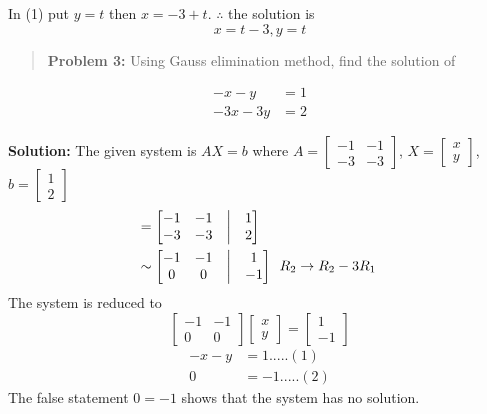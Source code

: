 \documentclass[
  letterpaper,
  DIV=11,
  numbers=noendperiod]{scrreprt}
\begin{document}
In (1) put \(y=t\) then \(x=-3+t\). \(\therefore\) the solution is
\[x=t-3,y=t\]

\begin{quote}
\textbf{Problem 3:} Using Gauss elimination method, find the solution of
\end{quote}

\begin{align*}
-x-y &=1\\
-3x-3y &=2
\end{align*}

\textbf{Solution:} The given system is \(AX=b\) where
\(A=\begin{bmatrix}
    -1 &-1\\
    -3 &-3
\end{bmatrix}\), \(X=\begin{bmatrix}
    x\\
    y
\end{bmatrix}\), \(b=\begin{bmatrix}
    1\\
    2
\end{bmatrix}\) \begin{align*}
    [A|b]&=\begin{bmatrix}
        -1 &-1 &\bigm| &1\\
        -3 &-3 &\bigm| &2
    \end{bmatrix}\\
    &\sim \begin{bmatrix}
        -1 &-1 &\bigm| &1\\
        0 &0 &\bigm| &-1
    \end{bmatrix}\begin{array}{c}
        R_2\rightarrow R_2-3R_1
    \end{array}
\end{align*} The system is reduced to \[\begin{bmatrix}
    -1 &-1\\
    0 &0
\end{bmatrix}\begin{bmatrix}
    x\\
    y
\end{bmatrix}=\begin{bmatrix}
    1\\
    -1
\end{bmatrix}\] \begin{align*}
    -x-y &=1.....(1)\\
    0 &=-1.....(2)
\end{align*} The false statement \(0=-1\) shows that the system has no
solution.
\end{document}
